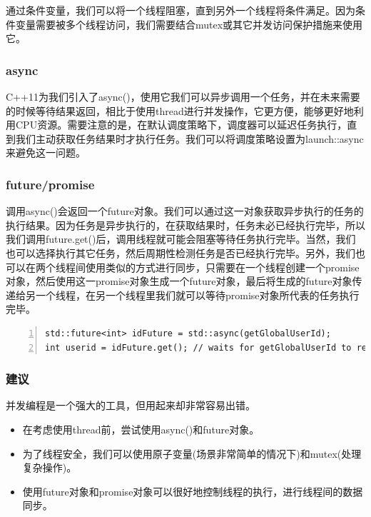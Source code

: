 \documentclass{ctexart}
\begin{document}
通过条件变量，我们可以将一个线程阻塞，直到另外一个线程将条件满足。因为条件变量需要被多个线程访问，我们需要结合mutex或其它并发访问保护措施来使用它。

\subsubsection{async}

C++11为我们引入了async()，使用它我们可以异步调用一个任务，并在未来需要的时候等待结果返回，相比于使用thread进行并发操作，它更方便，能够更好地利用CPU资源。需要注意的是，在默认调度策略下，调度器可以延迟任务执行，直到我们主动获取任务结果时才执行任务。我们可以将调度策略设置为launch::async来避免这一问题。

\subsubsection{future/promise}

调用async()会返回一个future对象。我们可以通过这一对象获取异步执行的任务的执行结果。因为任务是异步执行的，在获取结果时，任务未必已经执行完毕，所以我们调用future.get()后，调用线程就可能会阻塞等待任务执行完毕。当然，我们也可以选择执行其它任务，然后周期性检测任务是否已经执行完毕。另外，我们也可以在两个线程间使用类似的方式进行同步，只需要在一个线程创建一个promise对象，然后使用这一promise对象生成一个future对象，最后将生成的future对象传递给另一个线程，在另一个线程里我们就可以等待promise对象所代表的任务执行完毕。

\begin{lstlisting}[language={[ANSI]C},keywordstyle=\color{blue!70},commentstyle=\color{red!50!green!50!blue!50},frame=shadowbox, rulesepcolor=\color{red!20!green!20!blue!20},basicstyle=\small,numbers=left, numberstyle=\tiny,breaklines=true]
std::future<int> idFuture = std::async(getGlobalUserId);  
int userid = idFuture.get(); // waits for getGlobalUserId to return
\end{lstlisting}

\subsubsection*{建议}

并发编程是一个强大的工具，但用起来却非常容易出错。

\begin{itemize}
	\item 在考虑使用thread前，尝试使用async()和future对象。
	\item 为了线程安全，我们可以使用原子变量(场景非常简单的情况下)和mutex(处理复杂操作)。
	\item 使用future对象和promise对象可以很好地控制线程的执行，进行线程间的数据同步。
\end{itemize}
\end{document}
